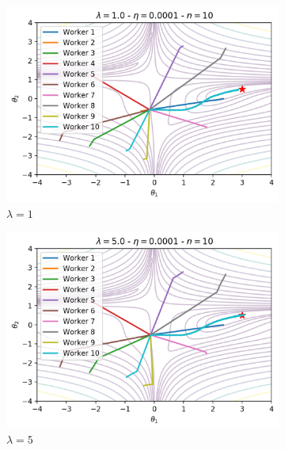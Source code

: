 \begin{figure}[H]
  \centering
  \begin{subfigure}{.24\textwidth}
    \centering
    \includegraphics[width=\linewidth]{resources/images/model_averaging_cf_1}
    \caption{$\lambda = 1$}
  \end{subfigure}
  \begin{subfigure}{.24\textwidth}
    \centering
    \includegraphics[width=\linewidth]{resources/images/model_averaging_cf_5}
    \caption{$\lambda = 5$}
  \end{subfigure}
  \begin{subfigure}{.24\textwidth}
    \centering

\end{subfigure}
\end{figure}
